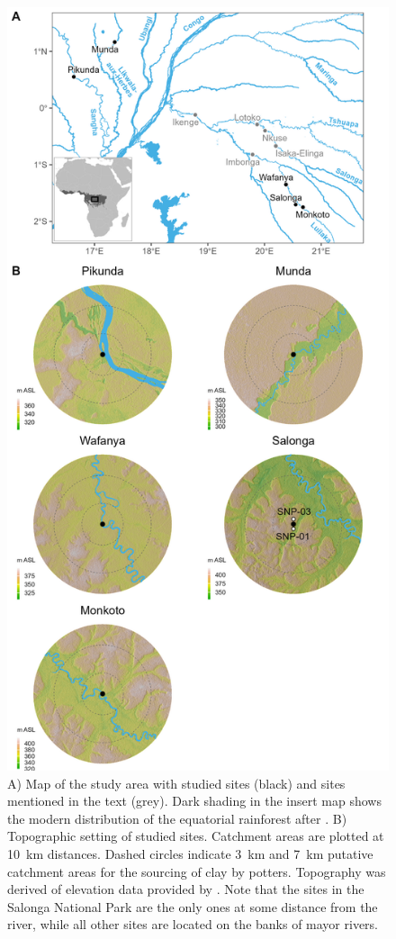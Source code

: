 \documentclass[preprint,10pt,oneside,onecolumn,authoryear]{elsarticle}
\begin{document}
 \begin{figure}[p]
 	\centering
 	\includegraphics[height=.85\textheight]{Fig_Map_Top.jpg}
 	\caption{A) Map of the study area with studied sites (black) and sites mentioned in the text (grey). Dark shading in the insert map shows the modern distribution of the equatorial rainforest after \citet{White.1983}. B) Topographic setting of studied sites. Catchment areas are plotted at 10~km distances. Dashed circles indicate 3~km \citep[35]{Gosselain.2005} and 7~km \citep[452]{Whitbread.2001} putative catchment areas for the sourcing of clay by potters. Topography was derived of elevation data provided by \citet{Hollister.2022}. Note that the sites in the Salonga National Park are the only ones at some distance from the river, while all other sites are located on the banks of mayor rivers.}
 \label{fig:map}
\end{figure}
\end{document}
